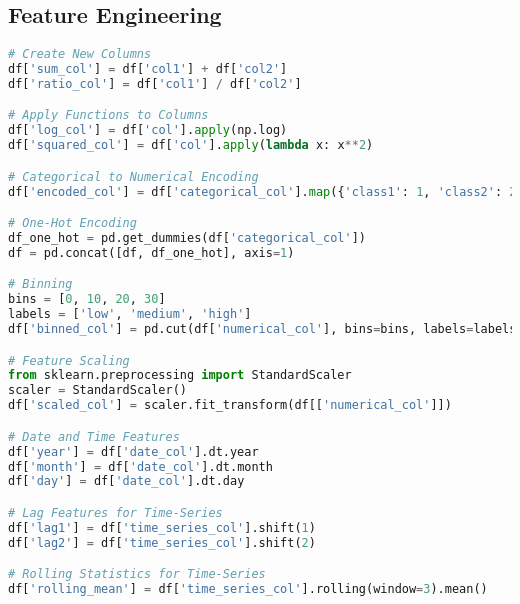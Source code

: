 \documentclass[english, threecolumn]{latex4ei/latex4ei_sheet}
\begin{document}
\begin{sectionbox}
\subsection{Feature Engineering}
\begin{lstlisting}[language=Python, gobble=0]
# Create New Columns
df['sum_col'] = df['col1'] + df['col2']
df['ratio_col'] = df['col1'] / df['col2']

# Apply Functions to Columns
df['log_col'] = df['col'].apply(np.log)
df['squared_col'] = df['col'].apply(lambda x: x**2)

# Categorical to Numerical Encoding
df['encoded_col'] = df['categorical_col'].map({'class1': 1, 'class2': 2})

# One-Hot Encoding
df_one_hot = pd.get_dummies(df['categorical_col'])
df = pd.concat([df, df_one_hot], axis=1)

# Binning
bins = [0, 10, 20, 30]
labels = ['low', 'medium', 'high']
df['binned_col'] = pd.cut(df['numerical_col'], bins=bins, labels=labels)

# Feature Scaling
from sklearn.preprocessing import StandardScaler
scaler = StandardScaler()
df['scaled_col'] = scaler.fit_transform(df[['numerical_col']])

# Date and Time Features
df['year'] = df['date_col'].dt.year
df['month'] = df['date_col'].dt.month
df['day'] = df['date_col'].dt.day

# Lag Features for Time-Series
df['lag1'] = df['time_series_col'].shift(1)
df['lag2'] = df['time_series_col'].shift(2)

# Rolling Statistics for Time-Series
df['rolling_mean'] = df['time_series_col'].rolling(window=3).mean()

\end{lstlisting}
\end{sectionbox}
\end{document}
